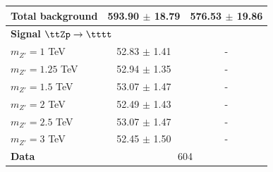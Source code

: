 \documentclass[../thesis.tex]{subfiles}
\begin{document}
\begin{table}[!htb]
{\begin{tabular}{lcc}
      \midrule
      Total background		 	& 593.90 $\pm$ 18.79	& 576.53 $\pm$ 19.86 \\
      \midrule
      \multicolumn{3}{l}{\textbf{Signal $\ttZp \rightarrow \tttt$}} 	\\	
      $m_{Z'}=1$ TeV 			& 52.83 $\pm$ 1.41		& - \\
      $m_{Z'}=1.25$ TeV 		& 52.94 $\pm$ 1.35		& - \\
      $m_{Z'}=1.5$ TeV 			& 53.07 $\pm$ 1.47		& - \\
      $m_{Z'}=2$ TeV 			& 52.49 $\pm$ 1.43		& - \\ %
      $m_{Z'}=2.5$ TeV 			& 53.07 $\pm$ 1.47		& - \\
      $m_{Z'}=3$ TeV 			& 52.45 $\pm$ 1.50		& - \\
      \midrule
      \textbf{Data}				& \multicolumn{2}{c}{604} 		\\
      \midrule\bottomrule
    \end{tabular}
}
\end{table}
\end{document}
